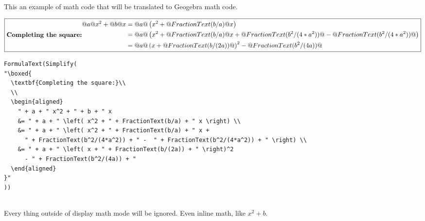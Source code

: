 \documentclass{article}
\begin{document}
This an example of math code that will be translated to Geogebra math
code.

\[
\boxed{
  \textbf{Completing the square:}\\
  \\
  \begin{aligned}
    @a@ x^2 + @b@ x
    &= @a@ \left( x^2 + @FractionText(b/a)@ x \right) \\
    &= @a@ \left( x^2 + @FractionText(b/a)@ x +
      @FractionText(b^2/(4*a^2))@ -  @FractionText(b^2/(4*a^2))@ \right) \\
    &= @a@ \left( x + @FractionText(b/(2a))@ \right)^2 
      - @FractionText(b^2/(4a))@
  \end{aligned}
}
\]

\noindent\hrulefill
\begin{verbatim}
FormulaText(Simplify(
"\boxed{
  \textbf{Completing the square:}\\
  \\
  \begin{aligned}
    " + a + " x^2 + " + b + " x
    &= " + a + " \left( x^2 + " + FractionText(b/a) + " x \right) \\
    &= " + a + " \left( x^2 + " + FractionText(b/a) + " x +
      " + FractionText(b^2/(4*a^2)) + " -  " + FractionText(b^2/(4*a^2)) + " \right) \\
    &= " + a + " \left( x + " + FractionText(b/(2a)) + " \right)^2 
      - " + FractionText(b^2/(4a)) + "
  \end{aligned}
}"
))
\end{verbatim}
\hrulefill\\

Every thing outside of display math mode will be ignored. Even inline
math, like $x^2 + b$.
\end{document}
